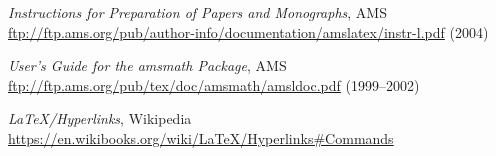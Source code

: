 \begin{thebibliography}{ABCDEFG12334567890}
\emph{Instructions for Preparation of Papers and Monographs}, AMS \\
\url{ftp://ftp.ams.org/pub/author-info/documentation/amslatex/instr-l.pdf} (2004)

\emph{User's Guide for the amsmath Package}, AMS \\
\url{ftp://ftp.ams.org/pub/tex/doc/amsmath/amsldoc.pdf} (1999--2002)

\emph{LaTeX/Hyperlinks}, Wikipedia \\
\url{https://en.wikibooks.org/wiki/LaTeX/Hyperlinks#Commands}

\end{thebibliography}
